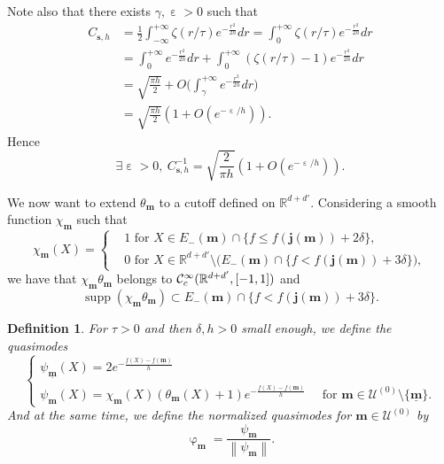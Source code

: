 \documentclass[12pt]{amsart}
\newcommand{\supp}{\operatorname{supp}}
\newcommand{\R}{\mathbb R}
\numberwithin{equation}{section}
\numberwithin{figure}{section}
\def\m{\mathbf{m}}
\def\s{\mathbf{s}}
\def\j{\mathbf{j}}
\def\um{\underline{\m}}
\DeclareMathOperator{\eps}{\varepsilon}
\DeclareMathOperator{\phii}{\varphi}
\newcommand{\vvert}[1]{\left\lVert#1\right\rVert}
\newtheorem{defin}{Definition}[section]
\def\uuu{{\mathcal U}}\def\vvv{{\mathcal V}}\def\www{{\mathcal W}}\def\xxx{{\mathcal X}}
\begin{document}
Note also that there exists $\gamma,\eps>0$ such that
\begin{equation*}
\begin{aligned}
    C_{\s,h} &= \frac 12\int_{-\infty}^{+\infty}\zeta(r/\tau)e^{-\frac{r^{2}}{2h}}dr = \int_0^{+\infty}\zeta(r/\tau)e^{-\frac{r^{2}}{2h}}dr\\
    &= \int_0^{+\infty}e^{-\frac{r^{2}}{2h}}dr + \int_0^{+\infty}(\zeta(r/\tau)-1)e^{-\frac{r^{2}}{2h}}dr\\
    &= \sqrt{\frac{\pi h}{2}} + O\big(\int_\gamma^{+\infty}e^{-\frac{r^{2}}{2h}}dr\big)\\
    &= \sqrt{\frac{\pi h}{2}}(1+O(e^{-\eps/h})).
\end{aligned}
\end{equation*}
Hence
\begin{equation}\label{eq:ch}
\exists\eps>0,\ C_{\s,h}^{-1} = \sqrt{\frac{2}{\pi h}}(1+O(e^{-\eps/h})).
\end{equation}

We now want to extend $\theta_\m$ to a cutoff defined on $\R^{d+d'}$. Considering a smooth function $\chi_\m$ such that
\begin{equation*}
\chi_\m(X) = \left\{\begin{aligned}
    &1\mbox{ for } X\in E_-(\m)\cap\{f \leq f(\j(\m)) + 2\delta\},\\
    &0\mbox{ for } X\in\R^{d+d'}\setminus\big(E_-(\m)\cap\{f < f(\j(\m)) + 3\delta\}\big),
\end{aligned}\right.
\end{equation*}
we have that $\chi_\m\theta_\m$ belongs to $\ccc_c^\infty(\R^{d+d'},[-1,1])$ and
\begin{equation*}
\supp(\chi_\m\theta_\m)\subset E_-(\m)\cap\{f < f(\j(\m)) + 3\delta\}.
\end{equation*}

\begin{defin}\label{def:quasimodes}
For $\tau>0$ and then $\delta,h>0$ small enough, we define the quasimodes 
\begin{equation*}
\left\{\begin{array}{l}
    \psi_{\um}(X)=2e^{-\frac{f(X)-f(\um)}{h}}\\
    \psi_{\m}(X)=\chi_\m(X)(\theta_\m(X)+1)e^{-\frac{f(X)-f(\m)}{h}}\quad\mbox{ for }\m\in\uuu^{(0)}\setminus\{\um\}.
\end{array}\right.
\end{equation*}
And at the same time, we define the normalized quasimodes for $\m\in\uuu^{(0)}$ by
\begin{equation*}
\phii_{\m}=\frac{\psi_{\m}}{\vvert{\psi_{\m}}}.
\end{equation*}
\end{defin}
\end{document}
